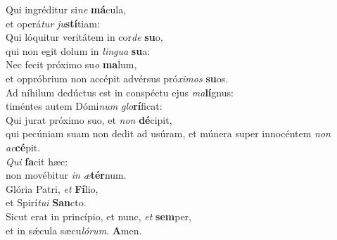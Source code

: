 \evenverse Qui ingréditur si\textit{ne} \textbf{má}cula,~\*\\
\evenverse et operá\textit{tur} \textit{ju}\textbf{stí}tiam:\\
\oddverse Qui lóquitur veritátem in cor\textit{de} \textbf{su}o,~\*\\
\oddverse qui non egit dolum in \textit{lin}\textit{gua} \textbf{su}a:\\
\evenverse Nec fecit próximo su\textit{o} \textbf{ma}lum,~\*\\
\evenverse et oppróbrium non accépit advérsus pró\textit{xi}\textit{mos} \textbf{su}os.\\
\oddverse Ad níhilum dedúctus est in conspéctu ejus \textit{ma}\textbf{lí}gnus:~\*\\
\oddverse timéntes autem Dómi\textit{num} \textit{glo}\textbf{rí}ficat:\\
\evenverse Qui jurat próximo suo, et \textit{non} \textbf{dé}cipit,~\*\\
\evenverse qui pecúniam suam non dedit ad usúram, et múnera super innocéntem \textit{non} \textit{ac}\textbf{cé}pit.\\
\oddverse \textit{Qui} \textbf{fa}cit hæc:~\*\\
\oddverse non movébitur \textit{in} \textit{æ}\textbf{tér}num.\\
\evenverse Glória Patri, \textit{et} \textbf{Fí}lio,~\*\\
\evenverse et Spirí\textit{tu}\textit{i} \textbf{San}cto.\\
\oddverse Sicut erat in princípio, et nunc, \textit{et} \textbf{sem}per,~\*\\
\oddverse et in sǽcula sæcu\textit{ló}\textit{rum}. \textbf{A}men.\\
